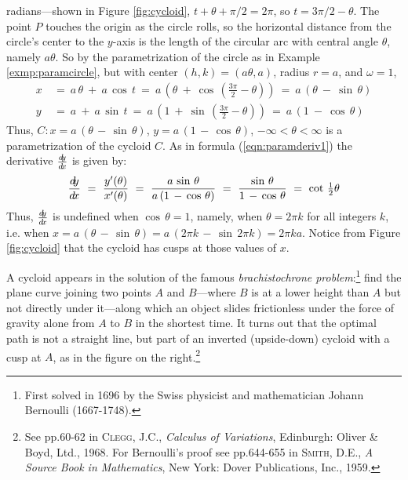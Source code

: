 \begin{exmp}
radians---shown in Figure \ref{fig:cycloid}, $t+\theta + \pi/2 = 2\pi$, so
$t=3\pi/2 - \theta$. The point $P$ touches the origin as the circle
rolls, so the horizontal distance from the circle's center to the $y$-axis is
the length of the circular arc with central angle $\theta$, namely $a \theta$.
So by the parametrization of the circle as in Example \ref{exmp:paramcircle},
but with center $(h,k)=(a \theta,a)$, radius $r=a$, and $\omega=1$,
\begin{align*}
x ~&=~ a\,\theta ~+~ a\,\cos\,t ~=~
a\,\left(\theta ~+~ \cos\,\left(\tfrac{3\pi}{2} - \theta\right)\right) ~=~
a\,(\theta ~-~ \sin\,\theta)\\
y ~&=~ a ~+~ a\,\sin\,t ~=~
a\,\left(1 ~+~ \sin\,\left(\tfrac{3\pi}{2} - \theta\right)\right) ~=~
a\,(1 ~-~ \cos\,\theta)
\end{align*}
Thus, $C: x=a\,(\theta \,-\, \sin\,\theta)$, $y=a\,(1 \,-\, \cos\,\theta)$,
$-\infty < \theta < \infty$ is a parametrization of the cycloid $C$.
\newpage
As in formula (\ref{eqn:paramderiv1}) the derivative $\frac{d\negmedspace y}{d\!x}$ is given by:
\[
\frac{d\negmedspace y}{d\!x} ~=~ \frac{y'(\theta)}{x'(\theta)} ~=~
\frac{a\,\sin\,\theta}{a\,(1 \,-\, \cos\,\theta)} ~=~
\frac{\sin\,\theta}{1 \,-\, \cos\,\theta} ~=~ \cot\,\tfrac{1}{2}\theta
\]
Thus, $\frac{d\negmedspace y}{d\!x}$ is undefined when $\cos\,\theta = 1$, namely, when
$\theta = 2\pi k$ for all integers $k$, i.e. when
$x=a\,(\theta \,-\, \sin\,\theta) = a\,(2\pi k \,-\, \sin\,2\pi k) =
2\pi ka$. Notice from Figure \ref{fig:cycloid} that the cycloid has cusps at
those values of $x$.

A cycloid appears in the solution of the famous
\emph{brachistochrone problem}:\footnote{First
solved in 1696 by the Swiss physicist and mathematician Johann Bernoulli
(1667-1748).} find the plane curve joining two points $A$ and $B$---where $B$ is
at a lower height than $A$ but not directly under it---along which an object
slides frictionless under the force of gravity alone from $A$ to $B$ in the
shortest time. It turns out that the optimal path is not a straight line, but
part of an inverted (upside-down) cycloid with a cusp at $A$, as in the figure
on the right.\footnote{See pp.60-62 in
\textsc{Clegg, J.C.}, \emph{Calculus of Variations}, Edinburgh: Oliver \& Boyd,
Ltd., 1968. For Bernoulli's proof see pp.644-655 in \textsc{Smith, D.E.},
\emph{A Source Book in Mathematics}, New York: Dover Publications, Inc., 1959.}
\end{exmp}\vspace{-3mm}
